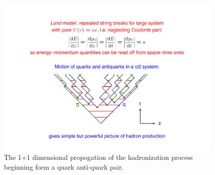 \begin{figure}
\begin{center}
\includegraphics[width=.65\textwidth]{pics/lund_model}
\end{center}
\caption{The 1+1 dimensional propogation of the hadronization process beginning form a quark anti-quark pair.  }
\label{fig:lund}
\end{figure}


